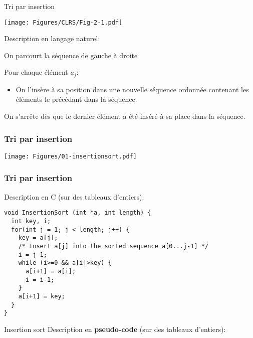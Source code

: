 \begin{frame}{Tri par insertion}

\hfill\texttt{[image: Figures/CLRS/Fig-2-1.pdf]}

Description en langage naturel:

\bigskip

On parcourt la séquence de gauche à droite

\bigskip

Pour chaque élément $a_j$:
\begin{itemize}
\item On l'{\alert{insère}} à sa position dans une nouvelle séquence ordonnée contenant les éléments le précédant dans la séquence.
\end{itemize}
On s'arrête dès que le dernier élément a été inséré à sa place dans la séquence.

\end{frame}

\begin{frame}
\frametitle{Tri par insertion}
\centerline{\texttt{[image: Figures/01-insertionsort.pdf]}}
\end{frame}

\begin{frame}[fragile]
\frametitle{Tri par insertion}

Description en C (sur des tableaux d'entiers):

{\small
\begin{verbatim}
void InsertionSort (int *a, int length) {
  int key, i;
  for(int j = 1; j < length; j++) {
    key = a[j];
    /* Insert a[j] into the sorted sequence a[0...j-1] */
    i = j-1;
    while (i>=0 && a[i]>key) {
      a[i+1] = a[i];
      i = i-1;
    }
    a[i+1] = key;
  }
}
\end{verbatim}
}

\end{frame}

\begin{frame}{Insertion sort}
Description en {\bf pseudo-code} (sur des tableaux d'entiers):

\bigskip


\end{frame}

